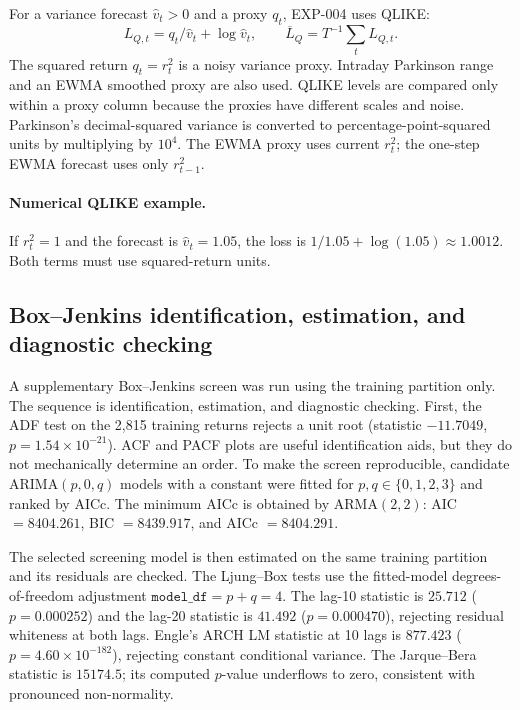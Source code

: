 \documentclass[11pt,a4paper]{article}
\begin{document}
For a variance forecast $\hat v_t>0$ and a proxy $q_t$, EXP-004 uses QLIKE:
\begin{equation}
 L_{Q,t}=q_t/\hat v_t+\log\hat v_t,\qquad
 \overline L_Q=T^{-1}\sum_t L_{Q,t}.
\end{equation}
The squared return $q_t=r_t^2$ is a noisy variance proxy. Intraday Parkinson range and an EWMA
smoothed proxy are also used. QLIKE levels are compared only within a proxy column because the
proxies have different scales and noise. Parkinson's decimal-squared variance is converted to
percentage-point-squared units by multiplying by $10^4$. The EWMA proxy uses current $r_t^2$;
the one-step EWMA forecast uses only $r_{t-1}^2$.

\paragraph{Numerical QLIKE example.} If $r_t^2=1$ and the forecast is $\hat v_t=1.05$, the loss
is $1/1.05+\log(1.05)\approx1.0012$. Both terms must use squared-return units.

\subsection{Box--Jenkins identification, estimation, and diagnostic checking}
A supplementary Box--Jenkins screen was run using the training partition only. The sequence is
identification, estimation, and diagnostic checking. First, the ADF test on the 2,815 training
returns rejects a unit root (statistic $-11.7049$, $p=1.54\times10^{-21}$). ACF and PACF plots
are useful identification aids, but they do not mechanically determine an order. To make the
screen reproducible, candidate ARIMA$(p,0,q)$ models with a constant were fitted for
$p,q\in\{0,1,2,3\}$ and ranked by AICc. The minimum AICc is obtained by ARMA$(2,2)$:
AIC $=8404.261$, BIC $=8439.917$, and AICc $=8404.291$.

The selected screening model is then estimated on the same training partition and its residuals
are checked. The Ljung--Box tests use the fitted-model degrees-of-freedom adjustment
$\texttt{model\_df}=p+q=4$. The lag-10 statistic is $25.712$ ($p=0.000252$) and the lag-20
statistic is $41.492$ ($p=0.000470$), rejecting residual whiteness at both lags. Engle's ARCH
LM statistic at 10 lags is $877.423$ ($p=4.60\times10^{-182}$), rejecting constant conditional
variance. The Jarque--Bera statistic is $15174.5$; its computed $p$-value underflows to zero,
consistent with pronounced non-normality.
\end{document}
